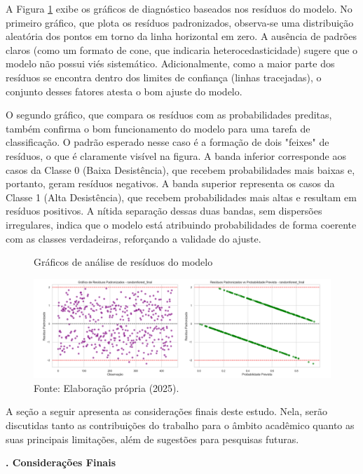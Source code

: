 A Figura \ref{fig:residuals} exibe os gráficos de diagnóstico baseados nos resíduos do modelo. No primeiro gráfico, que plota os resíduos padronizados, observa-se uma distribuição aleatória dos pontos em torno da linha horizontal em zero. A ausência de padrões claros (como um formato de cone, que indicaria heterocedasticidade) sugere que o modelo não possui viés sistemático. Adicionalmente, como a maior parte dos resíduos se encontra dentro dos limites de confiança (linhas tracejadas), o conjunto desses fatores atesta o bom ajuste do modelo.

O segundo gráfico, que compara os resíduos com as probabilidades preditas, também confirma o bom funcionamento do modelo para uma tarefa de classificação. O padrão esperado nesse caso é a formação de dois "feixes" de resíduos, o que é claramente visível na figura. A banda inferior corresponde aos casos da Classe 0 (Baixa Desistência), que recebem probabilidades mais baixas e, portanto, geram resíduos negativos. A banda superior representa os casos da Classe 1 (Alta Desistência), que recebem probabilidades mais altas e resultam em resíduos positivos. A nítida separação dessas duas bandas, sem dispersões irregulares, indica que o modelo está atribuindo probabilidades de forma coerente com as classes verdadeiras, reforçando a validade do ajuste.


\begin{figure}[H]
    \centering
    \caption{Gráficos de análise de resíduos do modelo}
    \label{fig:residuals}
    \includegraphics[width=\textwidth]{fig9_residuals.png}
    \caption*{Fonte: Elaboração própria (2025).}
\end{figure}

A seção a seguir apresenta as considerações finais deste estudo. Nela, serão discutidas tanto as contribuições do trabalho para o âmbito acadêmico quanto as suas principais limitações, além de sugestões para pesquisas futuras.


\vspace{2em}
\noindent\textbf{\themanualchapter. Considerações Finais}
\vspace{1em}
\par

